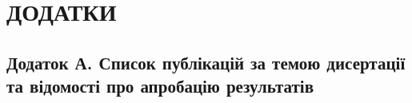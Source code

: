 \chapter*{\MakeUppercase{Додатки}}						%
\section*{Додаток А. Список публікацій за темою дисертації та відомості про апробацію результатів}


